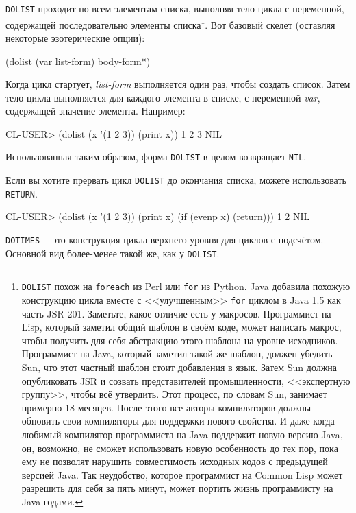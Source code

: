 \lstinline{DOLIST} проходит по всем элементам списка, выполняя тело цикла с переменной,
содержащей последовательно элементы списка\footnote{\lstinline{DOLIST} похож на \lstinline{foreach}
  из Perl или \lstinline{for} из Python. Java добавила похожую конструкцию цикла вместе с
  <<улучшенным>> \lstinline{for} циклом в Java 1.5 как часть JSR-201. Заметьте, какое отличие
  есть у макросов. Программист на Lisp, который заметил общий шаблон в своём коде, может
  написать макрос, чтобы получить для себя абстракцию этого шаблона на уровне
  исходников. Программист на Java, который заметил такой же шаблон, должен убедить Sun,
  что этот частный шаблон стоит добавления в язык. Затем Sun должна опубликовать JSR и
  созвать представителей промышленности, <<экспертную группу>>, чтобы всё утвердить. Этот
  процесс, по словам Sun, занимает примерно 18 месяцев. После этого все авторы
  компиляторов должны обновить свои компиляторы для поддержки нового свойства. И даже
  когда любимый компилятор программиста на Java поддержит новую версию Java, он,
  возможно, не сможет использовать новую особенность до тех пор, пока ему не позволят
  нарушить совместимость исходных кодов с предыдущей версией Java. Так неудобство,
  которое программист на Common Lisp может разрешить для себя за пять минут, может портить
  жизнь программисту на Java годами.}. Вот базовый скелет (оставляя некоторые
эзотерические опции):

\begin{myverb}
(dolist (var list-form)
  body-form*)
\end{myverb}

Когда цикл стартует, \textit{list-form} выполняется один раз, чтобы создать список. Затем
тело цикла выполняется для каждого элемента в списке, с переменной \textit{var},
содержащей значение элемента. Например:

\begin{myverb}
CL-USER> (dolist (x '(1 2 3)) (print x))
1
2
3
NIL
\end{myverb}

Использованная таким образом, форма \lstinline{DOLIST} в целом возвращает \lstinline{NIL}.

Если вы хотите прервать цикл \lstinline{DOLIST} до окончания списка, можете использовать
\lstinline{RETURN}.

\begin{myverb}
CL-USER> (dolist (x '(1 2 3)) (print x) (if (evenp x) (return)))
1
2
NIL
\end{myverb}

\lstinline{DOTIMES}~-- это конструкция цикла верхнего уровня для циклов с подсчётом. Основной
вид более-менее такой же, как у \lstinline{DOLIST}.

